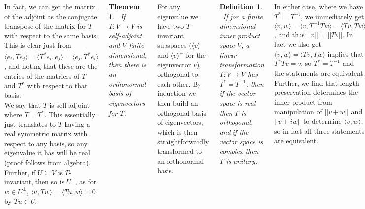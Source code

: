 \documentclass{tikzposter} %
\newtheorem{theorem}{Theorem}
\newtheorem{definition}{Definition}
\begin{document}
\begin{columns}
{       In fact, we can get the matrix of the adjoint as the conjugate transpose of the matrix for $T$ with respect to the same basis. This is clear just from $\langle e_{i}, Te_{j} \rangle = \langle T^{*}e_{i}, e_{j} \rangle = \overline{\langle e_{j}, T^{*}e_{i} \rangle}$, and noting that these are the entries of the matrices of $T$ and $T^{*}$ with respect to that basis. \\

       We say that $T$ is self-adjoint where $T = T^{*}$. This essentially just translates to $T$ having a real symmetric matrix with respect to any basis, so any eigenvalue it has will be real (proof follows from algebra). Further, if $U \subseteq V$ is $T$-invariant, then so is $U^{\bot}$, as for $w \in U^{\bot}$, $\langle u, Tw \rangle = \langle Tu, w \rangle = 0$ by $Tu \in U$. \\

       \begin{theorem}
       \ If $T : V \to V$ is self-adjoint and $V$ finite dimensional, then there is an orthonormal basis of eigenvectors for $T$.
       \end{theorem}
       \hphantom{}

       For any eigenvalue we have two $T$-invariant subspaces ($\langle v \rangle$ and $\langle v \rangle^{\bot}$ for the eigenvector $v$), orthogonal to each other. By induction we then build an orthogonal basis of eigenvectors, which is then straightforwardly transformed to an orthonormal basis. \\

       \begin{definition}
       \ If for a finite dimensional inner product space $V$, a linear transformation $T : V \to V$ has $T^{*} = T^{-1}$, then if the vector space is real then $T$ is orthogonal, and if the vector space is complex then $T$ is unitary.
       \end{definition}
       \hphantom{}

       In either case, where we have $T^{*} = T^{-1}$, we immediately get $\langle v, w \rangle = \langle v, T^{-1}Tw \rangle = \langle Tv, Tw \rangle $, and thus $||v|| = ||Tv||$. In fact we also get $\langle v, w \rangle = \langle Tv, Tw \rangle$ implies that $T^{*}Tv = v$, so $T^{*} = T^{-1}$ and the statements are equivalent. Further, we find that length preservation determines the inner product from manipulation of $||v+w||$ and $||v+iw||$ to determine $\langle v, w \rangle$, so in fact all three statements are equivalent.\\

}
\end{columns}
\end{document}
